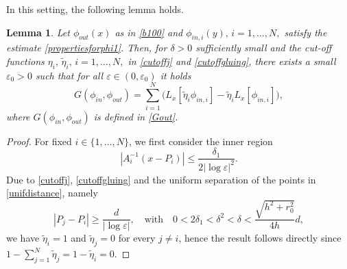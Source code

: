 \documentclass[11pt,reqno,a4paper]{amsart}
\numberwithin{equation}{section}
\newcommand{\ve}{\varepsilon}
\newtheorem{lemma}{Lemma}[section]
\begin{document}
In this setting, the following lemma holds.
\begin{lemma}\label{lemmaout}
Let $\phi_{out}(x)$ as in  \eqref{b100} and $\phi_{in,i}(y),\,i=1,\dots,N,$ satisfy the estimate \eqref{propertiesforphi1}. Then, for $\delta>0$ sufficiently small and the cut-off functions $\eta_{i}, \,\tilde{\eta}_{i},\,i=1,\dots,N,$ in \eqref{cutoffj} and \eqref{cutoffgluing}, there exists a small $\ve_0 >0$ such that for all $\ve \in (0,\ve_0)$ it holds \[G\left(\phi_{in},\phi_{out}\right)=\sum_{i=1}^{N}\big(L_{x}\left[\tilde{\eta}_i\phi_{in,i}\right]-\tilde{\eta}_iL_{x}\left[\phi_{in,i}\right]\big),\]
where $G(\phi_{in},\phi_{out})$  is defined in \eqref{Gout}.
\end{lemma}
\begin{proof}
For fixed $i\in\{1,\dots,N\}$, we first consider the inner region \[|A_i^{-1}(x-P_i)|\leq\frac{\delta_1}{2|\log\ve|^2}.\] 
Due to \eqref{cutoffj}, \eqref{cutoffgluing} and the uniform separation of the points in \eqref{unifdistance}, namely \[|P_j-P_i| \geq \frac{d}{|\log\ve|}, \quad \mbox{with} \quad 0<2\delta_1<\delta^2 <\delta < \frac{\sqrt{h^2+r_0^2}}{4h}d,\] 
we have $\tilde{\eta}_i=1$ and $\tilde{\eta}_j=0$ for every $j\neq i$, hence the result follows directly since $1-\sum\limits_{j=1}^{N}\tilde{\eta}_j=1-\tilde{\eta}_i= 0.$


\end{proof}
\end{document}
